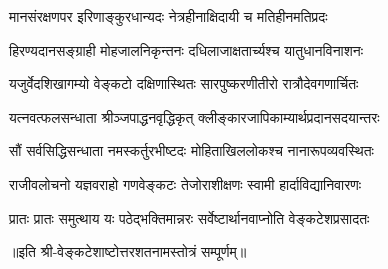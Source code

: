 \twolineshloka
{मानसंरक्षणपर इरिणाङ्कुरधान्यदः}
{नेत्रहीनाक्षिदायी च मतिहीनमतिप्रदः}

\twolineshloka
{हिरण्यदानसङ्ग्राही मोहजालनिकृन्तनः}
{दधिलाजाक्षतार्च्यश्च यातुधानविनाशनः}

\twolineshloka
{यजुर्वेदशिखागम्यो वेङ्कटो दक्षिणास्थितः}
{सारपुष्करणीतीरो रात्रौदेवगणार्चितः}

\twolineshloka
{यत्नवत्फलसन्धाता श्रीञ्जपाद्धनवृद्धिकृत्}
{क्लीङ्कारजापिकाम्यार्थप्रदानसदयान्तरः}

\twolineshloka
{सौं सर्वसिद्धिसन्धाता नमस्कर्तुरभीष्टदः}
{मोहिताखिललोकश्च नानारूपव्यवस्थितः}

\twolineshloka
{राजीवलोचनो यज्ञवराहो गणवेङ्कटः}
{तेजोराशीक्षणः स्वामी हार्दाविद्यानिवारणः}

{प्रातः प्रातः  समुत्थाय  यः  पठेद्भक्तिमान्नरः}
{सर्वेष्टार्थानवाप्नोति  वेङ्कटेशप्रसादतः}

॥इति श्री-वेङ्कटेशाष्टोत्तरशतनामस्तोत्रं  सम्पूर्णम्॥